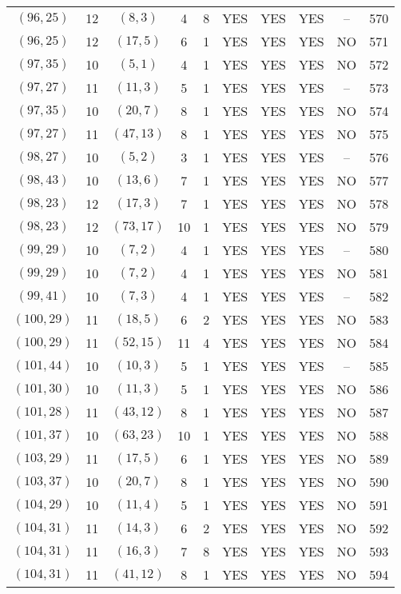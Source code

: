 \begin{longtable}{|c|c|c|c|c|c|c|c|c|c|}
$(96, 25)$ & 12 & $(8, 3)$ & 4 & 8 & YES & YES & YES & -- & 570\\
$(96, 25)$ & 12 & $(17, 5)$ & 6 & 1 & YES & YES & YES & NO & 571\\
$(97, 35)$ & 10 & $(5, 1)$ & 4 & 1 & YES & YES & YES & NO & 572\\
$(97, 27)$ & 11 & $(11, 3)$ & 5 & 1 & YES & YES & YES & -- & 573\\
$(97, 35)$ & 10 & $(20, 7)$ & 8 & 1 & YES & YES & YES & NO & 574\\
$(97, 27)$ & 11 & $(47, 13)$ & 8 & 1 & YES & YES & YES & NO & 575\\
$(98, 27)$ & 10 & $(5, 2)$ & 3 & 1 & YES & YES & YES & -- & 576\\
$(98, 43)$ & 10 & $(13, 6)$ & 7 & 1 & YES & YES & YES & NO & 577\\
$(98, 23)$ & 12 & $(17, 3)$ & 7 & 1 & YES & YES & YES & NO & 578\\
$(98, 23)$ & 12 & $(73, 17)$ & 10 & 1 & YES & YES & YES & NO & 579\\
$(99, 29)$ & 10 & $(7, 2)$ & 4 & 1 & YES & YES & YES & -- & 580\\
$(99, 29)$ & 10 & $(7, 2)$ & 4 & 1 & YES & YES & YES & NO & 581\\
$(99, 41)$ & 10 & $(7, 3)$ & 4 & 1 & YES & YES & YES & -- & 582\\
$(100, 29)$ & 11 & $(18, 5)$ & 6 & 2 & YES & YES & YES & NO & 583\\
$(100, 29)$ & 11 & $(52, 15)$ & 11 & 4 & YES & YES & YES & NO & 584\\
$(101, 44)$ & 10 & $(10, 3)$ & 5 & 1 & YES & YES & YES & -- & 585\\
$(101, 30)$ & 10 & $(11, 3)$ & 5 & 1 & YES & YES & YES & NO & 586\\
$(101, 28)$ & 11 & $(43, 12)$ & 8 & 1 & YES & YES & YES & NO & 587\\
$(101, 37)$ & 10 & $(63, 23)$ & 10 & 1 & YES & YES & YES & NO & 588\\
$(103, 29)$ & 11 & $(17, 5)$ & 6 & 1 & YES & YES & YES & NO & 589\\
$(103, 37)$ & 10 & $(20, 7)$ & 8 & 1 & YES & YES & YES & NO & 590\\
$(104, 29)$ & 10 & $(11, 4)$ & 5 & 1 & YES & YES & YES & NO & 591\\
$(104, 31)$ & 11 & $(14, 3)$ & 6 & 2 & YES & YES & YES & NO & 592\\
$(104, 31)$ & 11 & $(16, 3)$ & 7 & 8 & YES & YES & YES & NO & 593\\
$(104, 31)$ & 11 & $(41, 12)$ & 8 & 1 & YES & YES & YES & NO & 594\\

\end{longtable}
